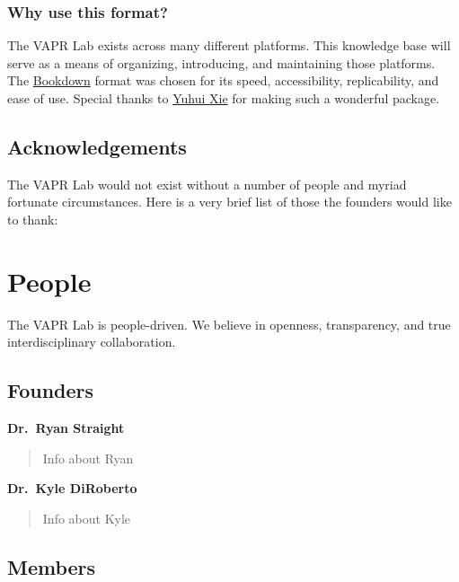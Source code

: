 \documentclass[12pt,]{memoir}
\begin{document}
\hypertarget{why-use-this-format}{%
\subsection*{Why use this format?}\label{why-use-this-format}}

The VAPR Lab exists across many different platforms. This knowledge base will serve as a means of organizing, introducing, and maintaining those platforms. The \href{https://bookdown.org}{Bookdown} format was chosen for its speed, accessibility, replicability, and ease of use. Special thanks to \href{https://yihui.name/}{Yuhui Xie} for making such a wonderful package.

\hypertarget{acknowledgements}{%
\section*{Acknowledgements}\label{acknowledgements}}

The VAPR Lab would not exist without a number of people and myriad fortunate circumstances. Here is a very brief list of those the founders would like to thank:

\hypertarget{people}{%
\chapter{People}\label{people}}

The VAPR Lab is people-driven. We believe in openness, transparency, and true interdisciplinary collaboration.

\hypertarget{founders}{%
\section{Founders}\label{founders}}

\textbf{Dr.~Ryan Straight}

\begin{quote}
Info about Ryan
\end{quote}

\textbf{Dr.~Kyle DiRoberto}

\begin{quote}
Info about Kyle
\end{quote}

\hypertarget{members}{%
\section{Members}\label{members}}
\end{document}
